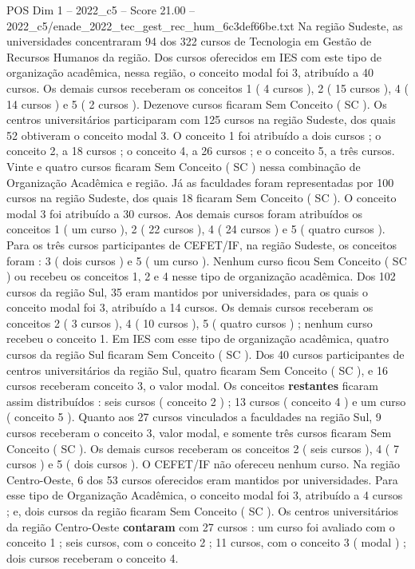\begin{textsample}{POS Dim 1 – 2022\_c5 – Score 21.00 – 2022\_c5/enade\_2022\_tec\_gest\_rec\_hum\_6c3def66be.txt}
Na região Sudeste, as universidades concentraram 94 dos 322 cursos de Tecnologia em Gestão de Recursos Humanos da região.
Dos cursos oferecidos em IES com este tipo de organização acadêmica, nessa região, o conceito modal foi 3, atribuído a 40 cursos.
Os demais cursos receberam os conceitos 1 ( 4 cursos ), 2 ( 15 cursos ), 4 ( 14 cursos ) e 5 ( 2 cursos ).
Dezenove cursos ficaram Sem Conceito ( SC ).
Os centros universitários participaram com 125 cursos na região Sudeste, dos quais 52 obtiveram o conceito modal 3.
O conceito 1 foi atribuído a dois cursos ; o conceito 2, a 18 cursos ; o conceito 4, a 26 cursos ; e o conceito 5, a três cursos.
Vinte e quatro cursos ficaram Sem Conceito ( SC ) nessa combinação de Organização Acadêmica e região.
Já as faculdades foram representadas por 100 cursos na região Sudeste, dos quais 18 ficaram Sem Conceito ( SC ).
O conceito modal 3 foi atribuído a 30 cursos.
Aos demais cursos foram atribuídos os conceitos 1 ( um curso ), 2 ( 22 cursos ), 4 ( 24 cursos ) e 5 ( quatro cursos ).
Para os três cursos participantes de CEFET/IF, na região Sudeste, os conceitos foram : 3 ( dois cursos ) e 5 ( um curso ).
Nenhum curso ficou Sem Conceito ( SC ) ou recebeu os conceitos 1, 2 e 4 nesse tipo de organização acadêmica.
Dos 102 cursos da região Sul, 35 eram mantidos por universidades, para os quais o conceito modal foi 3, atribuído a 14 cursos.
Os demais cursos receberam os conceitos 2 ( 3 cursos ), 4 ( 10 cursos ), 5 ( quatro cursos ) ; nenhum curso recebeu o conceito 1.
Em IES com esse tipo de organização acadêmica, quatro cursos da região Sul ficaram Sem Conceito ( SC ).
Dos 40 cursos participantes de centros universitários da região Sul, quatro ficaram Sem Conceito ( SC ), e 16 cursos receberam conceito 3, o valor modal.
Os conceitos \textbf{restantes} ficaram assim distribuídos : seis cursos ( conceito 2 ) ; 13 cursos ( conceito 4 ) e um curso ( conceito 5 ).
Quanto aos 27 cursos vinculados a faculdades na região Sul, 9 cursos receberam o conceito 3, valor modal, e somente três cursos ficaram Sem Conceito ( SC ).
Os demais cursos receberam os conceitos 2 ( seis cursos ), 4 ( 7 cursos ) e 5 ( dois cursos ).
O CEFET/IF não ofereceu nenhum curso.
Na região Centro-Oeste, 6 dos 53 cursos oferecidos eram mantidos por universidades.
Para esse tipo de Organização Acadêmica, o conceito modal foi 3, atribuído a 4 cursos ; e, dois cursos da região ficaram Sem Conceito ( SC ).
Os centros universitários da região Centro-Oeste \textbf{contaram} com 27 cursos : um curso foi avaliado com o conceito 1 ; seis cursos, com o conceito 2 ; 11 cursos, com o conceito 3 ( modal ) ; dois cursos receberam o conceito 4.

\end{textsample}
